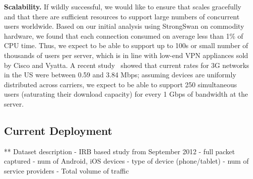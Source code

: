


\noindent\textbf{Scalability.} If wildly successful, we would like to
ensure that \meddle scales gracefully and that there are sufficient
resources to support large numbers of concurrent users
worldwide. Based on our initial analysis using StrongSwan on commodity
hardware, we found that each connection consumed on average less than
1\% of CPU time. Thus, we expect to be able to support up to 100s or
small number of thousands of users per server, which is in line with
low-end VPN appliances sold by Cisco and Vyatta. A recent
study~\cite{pcworld-speedtests} showed that current rates for 3G
networks in the US were between 0.59 and 3.84 Mbps; assuming devices
are uniformly distributed across carriers, we expect to be able to
support 250 simultaneous users (saturating their download capacity)
for every 1 Gbps of bandwidth at the server.

\subsection{Current Deployment}

** Dataset description
 - IRB based study from September 2012
   - full packet captured
   - num of Android, iOS devices - type of device (phone/tablet)
   - num of service providers
   - Total volume of traffic
   

 
 
